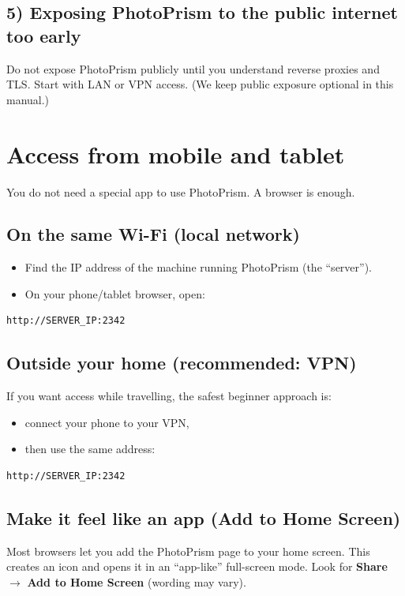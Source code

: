 \subsection{5) Exposing PhotoPrism to the public internet too early}
Do not expose PhotoPrism publicly until you understand reverse proxies and TLS.
Start with LAN or VPN access. (We keep public exposure optional in this manual.)

\section{Access from mobile and tablet}
You do not need a special app to use PhotoPrism. A browser is enough.

\subsection*{On the same Wi-Fi (local network)}
\begin{itemize}[leftmargin=*]
  \item Find the IP address of the machine running PhotoPrism (the ``server'').
  \item On your phone/tablet browser, open:
\end{itemize}

\begin{lstlisting}
http://SERVER_IP:2342
\end{lstlisting}

\subsection*{Outside your home (recommended: VPN)}
If you want access while travelling, the safest beginner approach is:
\begin{itemize}[leftmargin=*]
  \item connect your phone to your VPN,
  \item then use the same address:
\end{itemize}

\begin{lstlisting}
http://SERVER_IP:2342
\end{lstlisting}


\subsection*{Make it feel like an app (Add to Home Screen)}
Most browsers let you add the PhotoPrism page to your home screen.
This creates an icon and opens it in an ``app-like'' full-screen mode.
Look for \textbf{Share} $\rightarrow$ \textbf{Add to Home Screen} (wording may vary).

